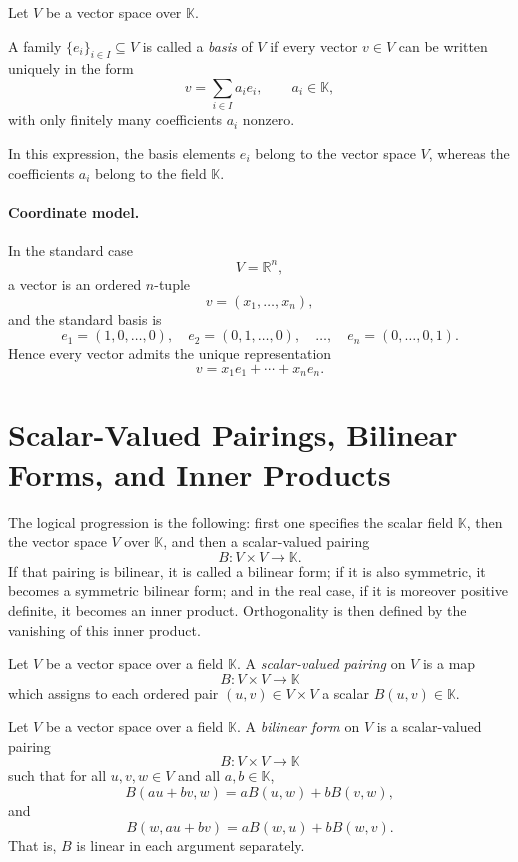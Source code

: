 \documentclass{article}
\begin{document}
	Let $V$ be a vector space over $\mathbb{K}$.
	
	\begin{definition}[Basis]
		A family $\{e_i\}_{i\in I}\subseteq V$ is called a \emph{basis} of $V$ if every vector $v\in V$ can be written uniquely in the form
		$$
		v=\sum_{i\in I} a_i e_i,
		\qquad
		a_i\in\mathbb{K},
		$$
		with only finitely many coefficients $a_i$ nonzero.
	\end{definition}
	
	In this expression, the basis elements $e_i$ belong to the vector space $V$, whereas the coefficients $a_i$ belong to the field $\mathbb{K}$.
	
	\paragraph{Coordinate model.}
	In the standard case
	$$
	V=\mathbb{R}^n,
	$$
	a vector is an ordered $n$-tuple
	$$
	v=(x_1,\dots,x_n),
	$$
	and the standard basis is
	$$
	e_1=(1,0,\dots,0),\quad
	e_2=(0,1,\dots,0),\quad \dots,\quad
	e_n=(0,\dots,0,1).
	$$
	Hence every vector admits the unique representation
	$$
	v=x_1e_1+\cdots+x_ne_n.
	$$
	
	\section{Scalar-Valued Pairings, Bilinear Forms, and Inner Products}
	
	The logical progression is the following: first one specifies the scalar field $\mathbb{K}$, then the vector space $V$ over $\mathbb{K}$, and then a scalar-valued pairing
	$$
	B:V\times V\to\mathbb{K}.
	$$
	If that pairing is bilinear, it is called a bilinear form; if it is also symmetric, it becomes a symmetric bilinear form; and in the real case, if it is moreover positive definite, it becomes an inner product. Orthogonality is then defined by the vanishing of this inner product.
	
	\begin{definition}
		Let $V$ be a vector space over a field $\mathbb{K}$. A \emph{scalar-valued pairing} on $V$ is a map
		$$
		B:V\times V\to\mathbb{K}
		$$
		which assigns to each ordered pair $(u,v)\in V\times V$ a scalar $B(u,v)\in\mathbb{K}$.
	\end{definition}
	
	\begin{definition}
		Let $V$ be a vector space over a field $\mathbb{K}$. A \emph{bilinear form} on $V$ is a scalar-valued pairing
		$$
		B:V\times V\to\mathbb{K}
		$$
		such that for all $u,v,w\in V$ and all $a,b\in\mathbb{K}$,
		$$
		B(au+bv,w)=aB(u,w)+bB(v,w),
		$$
		and
		$$
		B(w,au+bv)=aB(w,u)+bB(w,v).
		$$
		That is, $B$ is linear in each argument separately.
	\end{definition}
	
\end{document}
